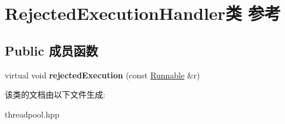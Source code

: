 \hypertarget{classRejectedExecutionHandler}{}\section{Rejected\+Execution\+Handler类 参考}
\label{classRejectedExecutionHandler}
\subsection*{Public 成员函数}
\begin{DoxyCompactItemize}
\item 
\mbox{\label{classRejectedExecutionHandler_abb6476c7d64a7bd3111fc1a39829858b}} 
virtual void {\bfseries rejected\+Execution} (const \hyperlink{classRunnable}{Runnable} \&r)
\end{DoxyCompactItemize}


该类的文档由以下文件生成\+:\begin{DoxyCompactItemize}
\item 
threadpool.\+hpp\end{DoxyCompactItemize}
